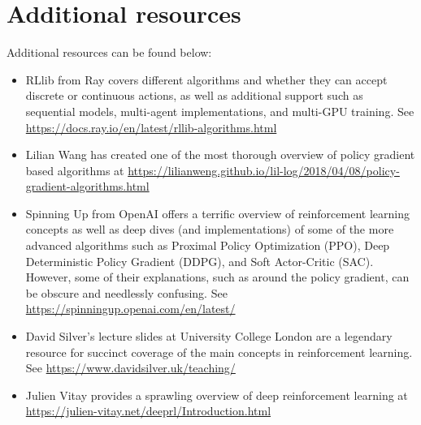 \documentclass{article}
\begin{document}
\section{Additional resources}
Additional resources can be found below:
\begin{itemize}
\item RLlib from Ray covers different algorithms and whether they can accept discrete or continuous actions, as well as additional support such as sequential models, multi-agent implementations, and multi-GPU training. See \url{https://docs.ray.io/en/latest/rllib-algorithms.html}
\item Lilian Wang has created one of the most thorough overview of policy gradient based algorithms at \url{https://lilianweng.github.io/lil-log/2018/04/08/policy-gradient-algorithms.html}
\item Spinning Up from OpenAI offers a terrific overview of reinforcement learning concepts as well as deep dives (and implementations) of some of the more advanced algorithms such as Proximal Policy Optimization (PPO), Deep Deterministic Policy Gradient (DDPG), and Soft Actor-Critic (SAC). However, some of their explanations, such as around the policy gradient, can be obscure and needlessly confusing. See \url{https://spinningup.openai.com/en/latest/}
\item David Silver's lecture slides at University College London are a legendary resource for succinct coverage of the main concepts in reinforcement learning. See \url{https://www.davidsilver.uk/teaching/}
\item Julien Vitay provides a sprawling overview of deep reinforcement learning at \url{https://julien-vitay.net/deeprl/Introduction.html}
\end{itemize}

\printbibliography
\end{document}
